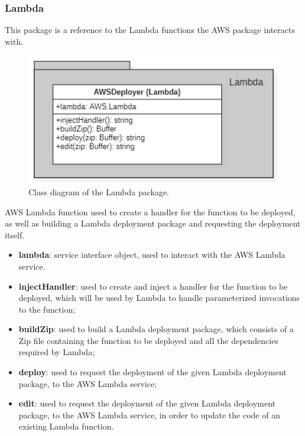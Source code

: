 	\subsubsection{Lambda}
	This package is a reference to the Lambda functions the AWS package interacts with.
	\begin{figure} [h!]
		\centering
		\includegraphics[width=0.7\linewidth]{diagrammi/etherless-server/Lambda}
		\caption{Class diagram of the Lambda package.}
	\end{figure}
	AWS Lambda function used to create a handler for the function to be deployed, as well as building a Lambda deployment package and requesting the deployment itself.
	\begin{itemize}
		\item \textbf{lambda}: service interface object, used to interact with the AWS Lambda service.
	\end{itemize}
	\begin{itemize}
		\item \textbf{injectHandler}: used to create and inject a handler for the function to be deployed, which will be used by Lambda to handle parameterized invocations to the function;
		\item \textbf{buildZip}: used to build a Lambda deployment package, which consists of a Zip file containing the function to be deployed and all the dependencies required by Lambda;
		\item \textbf{deploy}: used to request the deployment of the given Lambda deployment package, to the AWS Lambda service;
		\item \textbf{edit}: used to request the deployment of the given Lambda deployment package, to the AWS Lambda service, in order to update the code of an existing Lambda function.
	\end{itemize}
